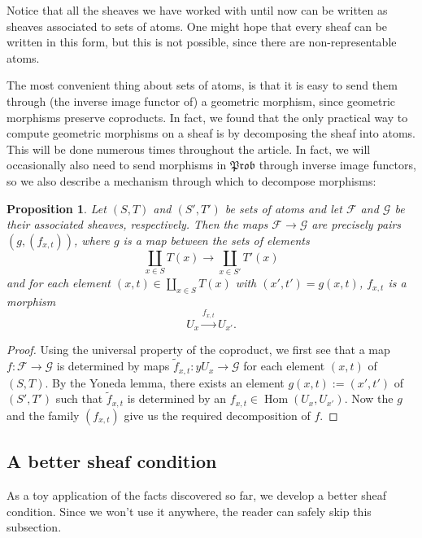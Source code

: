 \documentclass[a4paper]{amsproc}
\theoremstyle{plain}
\newtheorem{proposition}[theorem]{Proposition}
\theoremstyle{definition}
\theoremstyle{remark}
\numberwithin{equation}{section}
\DeclareMathOperator{\Hom}{Hom}
\newcommand{\y}{\textit{y}}
\newcommand{\Prob}{\mathfrak{Prob}}
\begin{document}
Notice that all the sheaves we have worked with until now can be written as sheaves associated to sets of atoms. One might hope that every sheaf can be written in this form, but this is not possible, since there are non-representable atoms. %

The most convenient thing about sets of atoms, is that it is easy to send them through (the inverse image functor of) a geometric morphism, since geometric morphisms preserve coproducts. In fact, we found that the only practical way to compute geometric morphisms on a sheaf is by decomposing the sheaf into atoms. This will be done numerous times throughout the article. In fact, we will occasionally also need to send morphisms in $\Prob$ through inverse image functors, so we also describe a mechanism through which to decompose morphisms:

\begin{proposition}\label{atom_coprod_maps}
    Let $(S,T)$ and $(S',T')$ be sets of atoms and let $\mathcal{F}$ and $\mathcal{G}$ be their associated sheaves, respectively. Then the maps $\mathcal{F} \to \mathcal{G}$ are precisely pairs $(g, (f_{x,t}))$, where $g$ is a map between the sets of elements
    \[
        \coprod_{x \in S} T(x) \to \coprod_{x \in S'} T'(x)
    \]
    and for each element $(x,t) \in \coprod_{x \in S} T(x)$ with $(x',t') = g(x,t)$, $f_{x,t}$ is a morphism
    \[
        U_x \xrightarrow{f_{x,t}} U_{x'} .
    \]
\end{proposition}
\begin{proof}
    Using the universal property of the coproduct, we first see that a map $f: \mathcal{F} \to \mathcal{G}$ is determined by maps $\tilde{f}_{x,t}: \y U_x \to \mathcal{G}$ for each element $(x,t)$ of $(S,T)$. By the Yoneda lemma, there exists an element $g(x,t) := (x',t')$ of $(S',T')$ such that $\tilde{f}_{x,t}$ is determined by an $f_{x,t} \in \Hom(U_x, U_{x'})$. Now the $g$ and the family $(f_{x,t})$ give us the required decomposition of $f$.
\end{proof}

\subsection{A better sheaf condition}

As a toy application of the facts discovered so far, we develop a better sheaf condition. Since we won't use it anywhere, the reader can safely skip this subsection.
\end{document}

